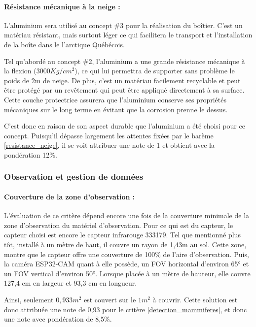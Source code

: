 \paragraph{Résistance mécanique à la neige :}
L'aluminium sera utilisé au concept \#3 pour la réalisation du boîtier. C'est un matériau résistant, mais surtout léger ce qui facilitera le transport et 
l'installation de la boîte dans le l'arctique Québécois.

\bigskip
Tel qu'abordé au concept \#2, l'aluminium a une grande résistance mécanique à la flexion ($3000Kg/cm^2$), ce qui lui permettra de supporter sans problème le poids de 2m de neige. 
De plus, c'est un matériau facilement recyclable et peut être protégé par un revêtement qui peut être appliqué directement à sa surface. Cette couche protectrice 
assurera que l'aluminium conserve ses propriétés mécaniques sur le long terme en évitant que la corrosion prenne le dessus.

\bigskip
C'est donc en raison de son aspect durable que l'aluminium a été choisi pour ce concept. Puisqu'il dépasse largement les attentes fixées par le barème \ref{resistance_neige}, il 
se voit attribuer une note de 1 et obtient avec la pondération 12\%.


\subsubsection{Observation et gestion de données}

\paragraph{Couverture de la zone d'observation :}
L’évaluation de ce critère dépend encore une fois de la couverture minimale de la zone d’observation du matériel d’observation. Pour ce qui est du capteur, le capteur choisi est encore le capteur infrarouge 333179. Tel que mentionné plus tôt, installé à un mètre de haut, il couvre un rayon de 1,43m au sol. Cette zone, montre que le capteur offre une couverture de 100\% de l’aire d’observation. Puis, la caméra ESP32-CAM quant à elle possède, un FOV horizontal d’environ 65° et un FOV vertical d’environ 50°. Lorsque placée à un mètre de hauteur, elle couvre 127,4 cm en largeur et 93,3 cm en longueur. 

\bigskip
Ainsi, seulement $0,933 m^2$ est couvert sur le $1 m^2$ à couvrir. Cette solution est donc attribuée une note de 0,93 pour le critère \ref{detection_mammiferes}, et donc une note avec pondération de 8,5\%.


